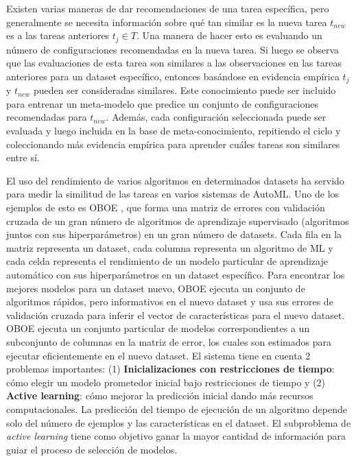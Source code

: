 \documentclass[a4paper,12pt]{article}
\begin{document}
Existen varias maneras de dar recomendaciones de una tarea específica, pero generalmente se necesita información sobre qué tan similar es la nueva tarea  $t_{new}$ es a las tareas anteriores $t_j \in T$. Una manera de hacer esto es evaluando un número de configuraciones recomendadas en la nueva tarea. Si luego se observa que las evaluaciones de esta tarea son similares a las observaciones en las tareas anteriores para un dataset específico, entonces basándose en evidencia empírica $t_j$ y $t_{new}$ pueden ser consideradas similares. Este conocimiento puede ser incluido para entrenar un meta-modelo que predice un conjunto de configuraciones recomendadas para $t_{new}$. Además, cada configuración seleccionada puede ser evaluada y luego incluida en la base de meta-conocimiento, repitiendo el ciclo y coleccionando más evidencia empírica para aprender cuáles tareas son similares entre sí.

El uso del rendimiento de varios algoritmos en determinados datasets ha servido para medir la similitud de las tareas en varios sistemas de AutoML. Uno de los ejemplos de esto es OBOE \cite{yang2018oboe}, que forma una matriz de errores con validación cruzada de un gran número de algoritmos de aprendizaje supervisado (algoritmos juntos con sus hiperparámetros) en un gran número de datasets. Cada fila  en la matriz representa un dataset, cada columna representa un algoritmo de ML y cada celda representa el rendimiento de un modelo particular de aprendizaje automático con sus hiperparámetros en un dataset específico. Para encontrar los mejores modelos para un dataset nuevo, OBOE ejecuta un conjunto de algoritmos rápidos, pero informativos en el nuevo dataset y usa sus errores de validación cruzada para inferir el vector de características para el nuevo dataset. 
OBOE ejecuta un conjunto particular de modelos correspondientes a un subconjunto de columnas en la matriz de error, los cuales son estimados para ejecutar eficientemente en el nuevo dataset. El sistema tiene en cuenta 2 problemas importantes: (1) \textbf{Inicializaciones con restricciones de tiempo}: cómo elegir un modelo prometedor inicial bajo restricciones de tiempo y (2) \textbf{Active learning}: cómo mejorar la predicción inicial dando más recursos computacionales. La predicción del tiempo de ejecución de un algoritmo depende solo del número de ejemplos y las características en el dataset. El subproblema de \textit{active learning} tiene como objetivo ganar la mayor cantidad de información para guiar el proceso de selección de modelos.
\end{document}
